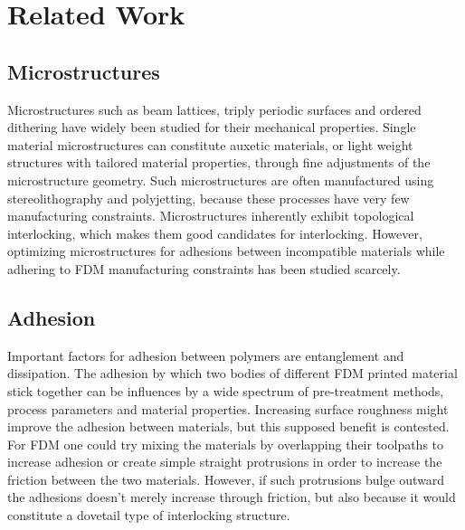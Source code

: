 \section{Related Work}


\subsection{Microstructures}
Microstructures such as beam lattices, triply periodic surfaces and ordered dithering have widely been studied for their mechanical properties\cite{Cadman2013,Zhang2018a,tamburrino2018}.
Single material microstructures can constitute auxetic materials, or light weight structures with tailored material properties, through fine adjustments of the microstructure geometry.
Such microstructures are often manufactured using stereolithography and polyjetting, because these processes have very few manufacturing constraints.
Microstructures inherently exhibit topological interlocking, which makes them good candidates for interlocking\cite{freund2019determination}.
However, optimizing microstructures for adhesions between incompatible materials while adhering to FDM manufacturing constraints has been studied scarcely.



\subsection{Adhesion}

Important factors for adhesion between polymers are entanglement and dissipation\cite{abbott2015adhesion}.
The adhesion by which two bodies of different FDM printed material stick together can be influences by a wide spectrum of pre-treatment methods, process parameters and material properties\cite{freund2019determination}.
Increasing surface roughness might improve the adhesion between materials\cite{huttenbach1991interface,gent1990model}, but this supposed benefit is contested\cite{abbott2015adhesion}.
For FDM one could try mixing the materials by overlapping their toolpaths to increase adhesion or create simple straight protrusions in order to increase the friction between the two materials\cite{tamburrino19}.
However, if such protrusions bulge outward the adhesions doesn't merely increase through friction, but also because it would constitute a dovetail type of interlocking structure.



